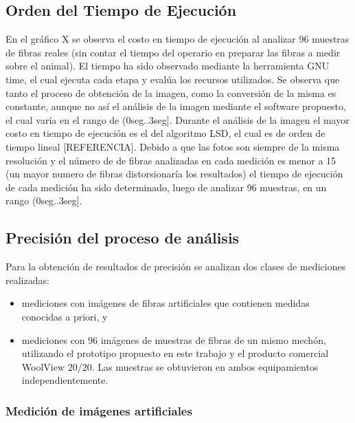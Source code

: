 \documentclass[runningheads,a4paper]{llncs}
\begin{document}
\subsection{Orden del Tiempo de Ejecución}
En el gráfico X se observa el costo en tiempo de ejecución al analizar 96 muestras de fibras reales (sin contar el tiempo del operario en preparar las fibras a medir sobre el animal). El tiempo ha sido observado mediante la herramienta GNU time, el cual ejecuta cada etapa y evalúa los recursos utilizados. Se observa que tanto el proceso de obtención de la imagen, como la conversión de la misma es constante, aunque no así el análisis de la imagen mediante el software propuesto, el cual varía en el rango de (0seg..3seg].
Durante el análisis de la imagen el mayor costo en tiempo de ejecución es el del algoritmo LSD, el cual es de orden de tiempo lineal [REFERENCIA]. Debido a que las fotos son siempre de la misma resolución y el número de de fibras analizadas en cada medición es menor a 15 (un mayor numero de fibras distorsionaría los resultados) el tiempo de ejecución de cada medición ha sido determinado, luego de analizar 96 muestras, en un rango (0seg..3seg].

\subsection{Precisión del proceso de análisis}

Para la obtención de resultados de precisión se analizan dos clases de mediciones realizadas: 
\begin{itemize}
\item mediciones con imágenes de fibras artificiales que contienen medidas conocidas a priori, y
\item mediciones con 96 imágenes de muestras de fibras de un mismo mechón, utilizando el prototipo propuesto en este trabajo y el producto comercial WoolView 20/20. Las muestras se obtuvieron en ambos equipamientos independientemente.
\end{itemize}

\subsubsection{Medición de imágenes artificiales}
\end{document}
